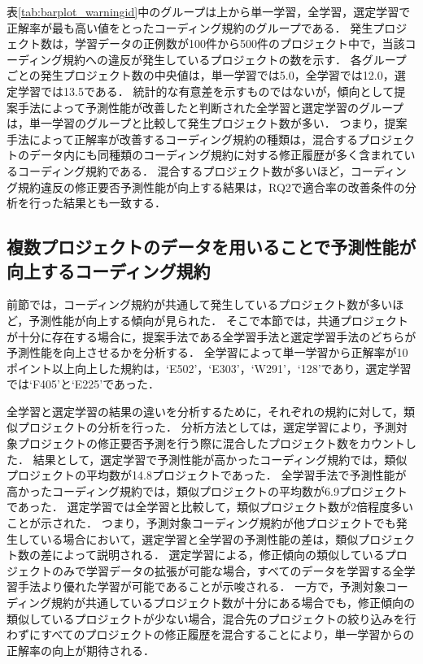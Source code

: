 \documentclass[11pt]{jreport}
\begin{document}
表\ref{tab:barplot_warningid}中のグループは上から単一学習，全学習，選定学習で正解率が最も高い値をとったコーディング規約のグループである．
発生プロジェクト数は，学習データの正例数が100件から500件のプロジェクト中で，当該コーディング規約への違反が発生しているプロジェクトの数を示す．
各グループごとの発生プロジェクト数の中央値は，単一学習では5.0，全学習では12.0，選定学習では13.5である．
統計的な有意差を示すものではないが，傾向として提案手法によって予測性能が改善したと判断された全学習と選定学習のグループは，単一学習のグループと比較して発生プロジェクト数が多い．
つまり，提案手法によって正解率が改善するコーディング規約の種類は，混合するプロジェクトのデータ内にも同種類のコーディング規約に対する修正履歴が多く含まれているコーディング規約である．
混合するプロジェクト数が多いほど，コーディング規約違反の修正要否予測性能が向上する結果は，RQ2で適合率の改善条件の分析を行った結果とも一致する．

\subsection{複数プロジェクトのデータを用いることで予測性能が向上するコーディング規約}

前節では，コーディング規約が共通して発生しているプロジェクト数が多いほど，予測性能が向上する傾向が見られた．
そこで本節では，共通プロジェクトが十分に存在する場合に，提案手法である全学習手法と選定学習手法のどちらが予測性能を向上させるかを分析する．
全学習によって単一学習から正解率が10ポイント以上向上した規約は，`E502'，`E303'，`W291'，`128'であり，選定学習では`F405'と`E225'であった．

全学習と選定学習の結果の違いを分析するために，それぞれの規約に対して，類似プロジェクトの分析を行った．
分析方法としては，選定学習により，予測対象プロジェクトの修正要否予測を行う際に混合したプロジェクト数をカウントした．
結果として，選定学習で予測性能が高かったコーディング規約では，類似プロジェクトの平均数が14.8プロジェクトであった．
全学習手法で予測性能が高かったコーディング規約では，類似プロジェクトの平均数が6.9プロジェクトであった．
選定学習では全学習と比較して，類似プロジェクト数が2倍程度多いことが示された．
つまり，予測対象コーディング規約が他プロジェクトでも発生している場合において，選定学習と全学習の予測性能の差は，類似プロジェクト数の差によって説明される．
選定学習による，修正傾向の類似しているプロジェクトのみで学習データの拡張が可能な場合，すべてのデータを学習する全学習手法より優れた学習が可能であることが示唆される．
一方で，予測対象コーディング規約が共通しているプロジェクト数が十分にある場合でも，修正傾向の類似しているプロジェクトが少ない場合，混合先のプロジェクトの絞り込みを行わずにすべてのプロジェクトの修正履歴を混合することにより，単一学習からの正解率の向上が期待される．
\end{document}
